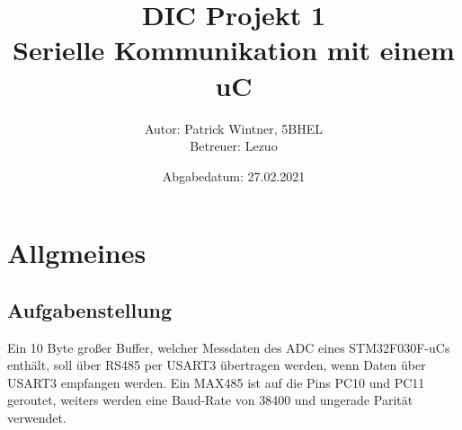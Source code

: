 \documentclass[11pt]{report}
\begin{document}
	\title{DIC Projekt 1\\{\small Serielle Kommunikation mit einem uC}}
	\author{Autor: Patrick Wintner, 5BHEL\\Betreuer: Lezuo}
	\date{Abgabedatum: 27.02.2021}
	\maketitle
	\tableofcontents
	\pagebreak
	\chapter{Allgmeines}
	\section{Aufgabenstellung}
		Ein 10 Byte großer Buffer, welcher Messdaten des ADC eines STM32F030F-uCs enthält, soll über RS485 per USART3 übertragen werden, wenn Daten über USART3 empfangen werden. Ein MAX485 ist auf die Pins PC10 und PC11 geroutet, weiters werden eine Baud-Rate von 38400 und ungerade Parität verwendet.
\end{document}
